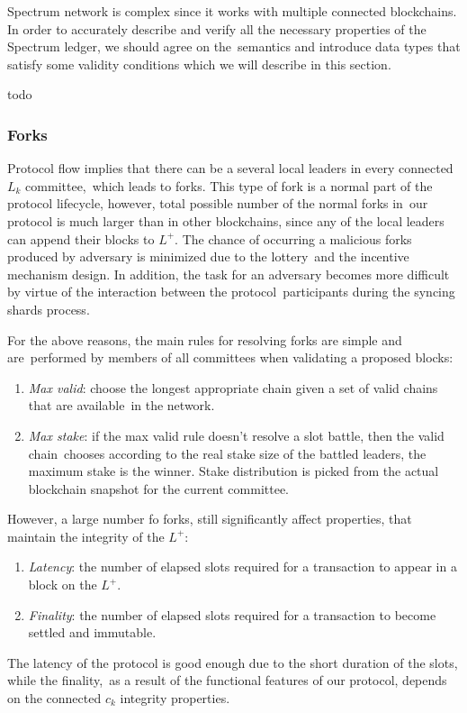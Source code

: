 Spectrum network is complex since it works with multiple connected blockchains.
In order to accurately describe and verify all the necessary properties of the Spectrum ledger, we should agree on the\
semantics and introduce data types that satisfy some validity conditions which we will describe in this section.


todo

\subsubsection{Forks}\label{subsec:resolving-forks}

Protocol flow implies that there can be a several local leaders in every connected $L_k$ committee,\
which leads to forks.
This type of fork is a normal part of the protocol lifecycle, however, total possible number of the normal forks in\
our protocol is much larger than in other blockchains, since any of the local leaders can append their blocks to $L^+$.
The chance of occurring a malicious forks produced by adversary is minimized due to the lottery\
and the incentive mechanism design.
In addition, the task for an adversary becomes more difficult by virtue of the interaction between the protocol\
participants during the syncing shards process.

For the above reasons, the main rules for resolving forks are simple and are\
performed by members of all committees when validating a proposed blocks:
\begin{enumerate}
    \item \textit{Max valid}: choose the longest appropriate chain given a set of valid chains that are available\
    in the network.
    \item \textit{Max stake}: if the max valid rule doesn't resolve a slot battle, then the valid chain\
    chooses according to the real stake size of the battled leaders, the maximum stake is the winner.
    Stake distribution is picked from the actual blockchain snapshot for the current committee.
\end{enumerate}

However, a large number fo forks, still significantly affect properties, that maintain the integrity of the $L^+$:
\begin{enumerate}
    \item \textit{Latency}: the number of elapsed slots required for a transaction to appear in a block on the $L^+$.
    \item \textit{Finality}: the number of elapsed slots required for a transaction to become settled and immutable.
\end{enumerate}
The latency of the protocol is good enough due to the short duration of the slots, while the finality,\
as a result of the functional features of our protocol, depends on the connected $c_k$ integrity properties.

